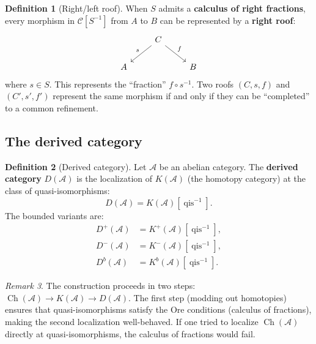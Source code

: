 \documentclass[a4paper,12pt]{book}
\theoremstyle{definition}
\newtheorem{definition}{Definition}[section]
\theoremstyle{plain}
\theoremstyle{remark}
\newtheorem{remark}[definition]{Remark}
\begin{document}
\begin{definition}[Right/left roof]\label{def:roof}
When $S$ admits a \textbf{calculus of right fractions}, every morphism in $\mathcal{C}[S^{-1}]$
from $A$ to $B$ can be represented by a \textbf{right roof}:
\[
\begin{tikzcd}
    & C \arrow[dl, "s"'] \arrow[dr, "f"] & \\
    A & & B
\end{tikzcd}
\]
where $s \in S$. This represents the ``fraction'' $f \circ s^{-1}$.
Two roofs $(C, s, f)$ and $(C', s', f')$ represent the same morphism if and only if
they can be ``completed'' to a common refinement.
\end{definition}

\subsection{The derived category}\label{subsec:derived-cat-def}

\begin{definition}[Derived category]\label{def:derived-cat}
Let $\mathcal{A}$ be an abelian category. The \textbf{derived category} $D(\mathcal{A})$
is the localization of $K(\mathcal{A})$ (the homotopy category) at the class of
quasi-isomorphisms:
\[
    D(\mathcal{A}) = K(\mathcal{A})[\operatorname{qis}^{-1}].
\]
The bounded variants are:
\begin{align*}
    D^+(\mathcal{A}) &= K^+(\mathcal{A})[\operatorname{qis}^{-1}], \\
    D^-(\mathcal{A}) &= K^-(\mathcal{A})[\operatorname{qis}^{-1}], \\
    D^b(\mathcal{A}) &= K^b(\mathcal{A})[\operatorname{qis}^{-1}].
\end{align*}
\end{definition}

\begin{remark}\label{rem:why-two-steps}
The construction proceeds in two steps: $\operatorname{Ch}(\mathcal{A}) \to K(\mathcal{A}) \to D(\mathcal{A})$.
The first step (modding out homotopies) ensures that quasi-isomorphisms satisfy the Ore
conditions (calculus of fractions), making the second localization well-behaved.
If one tried to localize $\operatorname{Ch}(\mathcal{A})$ directly at quasi-isomorphisms,
the calculus of fractions would fail.
\end{remark}
\end{document}
